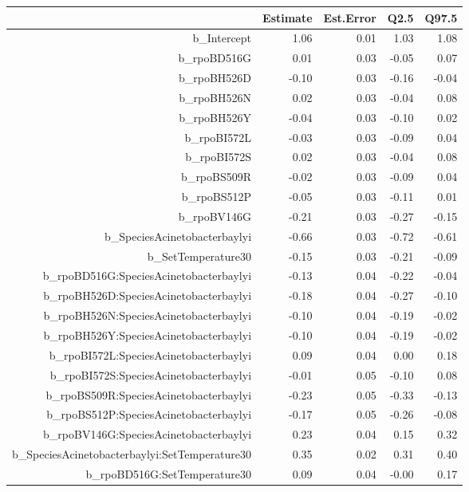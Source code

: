 \begin{table}[ht]
\centering
\begin{tabular}{rrrrr}
  \hline
 & Estimate & Est.Error & Q2.5 & Q97.5 \\ 
  \hline
b\_Intercept & 1.06 & 0.01 & 1.03 & 1.08 \\ 
  b\_rpoBD516G & 0.01 & 0.03 & -0.05 & 0.07 \\ 
  b\_rpoBH526D & -0.10 & 0.03 & -0.16 & -0.04 \\ 
  b\_rpoBH526N & 0.02 & 0.03 & -0.04 & 0.08 \\ 
  b\_rpoBH526Y & -0.04 & 0.03 & -0.10 & 0.02 \\ 
  b\_rpoBI572L & -0.03 & 0.03 & -0.09 & 0.04 \\ 
  b\_rpoBI572S & 0.02 & 0.03 & -0.04 & 0.08 \\ 
  b\_rpoBS509R & -0.02 & 0.03 & -0.09 & 0.04 \\ 
  b\_rpoBS512P & -0.05 & 0.03 & -0.11 & 0.01 \\ 
  b\_rpoBV146G & -0.21 & 0.03 & -0.27 & -0.15 \\ 
  b\_SpeciesAcinetobacterbaylyi & -0.66 & 0.03 & -0.72 & -0.61 \\ 
  b\_SetTemperature30 & -0.15 & 0.03 & -0.21 & -0.09 \\ 
  b\_rpoBD516G:SpeciesAcinetobacterbaylyi & -0.13 & 0.04 & -0.22 & -0.04 \\ 
  b\_rpoBH526D:SpeciesAcinetobacterbaylyi & -0.18 & 0.04 & -0.27 & -0.10 \\ 
  b\_rpoBH526N:SpeciesAcinetobacterbaylyi & -0.10 & 0.04 & -0.19 & -0.02 \\ 
  b\_rpoBH526Y:SpeciesAcinetobacterbaylyi & -0.10 & 0.04 & -0.19 & -0.02 \\ 
  b\_rpoBI572L:SpeciesAcinetobacterbaylyi & 0.09 & 0.04 & 0.00 & 0.18 \\ 
  b\_rpoBI572S:SpeciesAcinetobacterbaylyi & -0.01 & 0.05 & -0.10 & 0.08 \\ 
  b\_rpoBS509R:SpeciesAcinetobacterbaylyi & -0.23 & 0.05 & -0.33 & -0.13 \\ 
  b\_rpoBS512P:SpeciesAcinetobacterbaylyi & -0.17 & 0.05 & -0.26 & -0.08 \\ 
  b\_rpoBV146G:SpeciesAcinetobacterbaylyi & 0.23 & 0.04 & 0.15 & 0.32 \\ 
  b\_SpeciesAcinetobacterbaylyi:SetTemperature30 & 0.35 & 0.02 & 0.31 & 0.40 \\ 
  b\_rpoBD516G:SetTemperature30 & 0.09 & 0.04 & -0.00 & 0.17 \\ 

\end{tabular}
\end{table}
